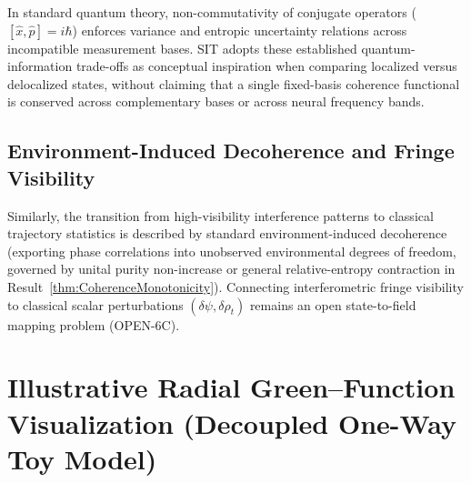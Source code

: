 \documentclass[american,11pt,letterpaper]{article}
\def\texttt#1{#1}%
\begin{document}
In standard quantum theory, non-commutativity of conjugate operators ($[\hat{x}, \hat{p}] = i\hbar$) enforces variance and entropic uncertainty relations across incompatible measurement bases. SIT adopts these established quantum-information trade-offs as conceptual inspiration when comparing localized versus delocalized states, without claiming that a single fixed-basis coherence functional is conserved across complementary bases or across neural frequency bands.

\subsection{Environment-Induced Decoherence and Fringe Visibility}

Similarly, the transition from high-visibility interference patterns to classical trajectory statistics is described by standard environment-induced decoherence (exporting phase correlations into unobserved environmental degrees of freedom, governed by unital purity non-increase or general relative-entropy contraction in Result~\ref{thm:CoherenceMonotonicity}). Connecting interferometric fringe visibility to classical scalar perturbations $(\delta\psi, \delta\rho_t)$ remains an open state-to-field mapping problem (\texttt{OPEN-6C}).

\section{Illustrative Radial Green--Function Visualization (Decoupled One-Way Toy Model)}
\label{sec:sphericalresonancesrevisited}
\end{document}

